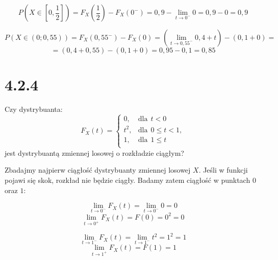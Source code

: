 \documentclass{article}
\begin{document}
\begin{equation*}
    P(X \in [0, \frac{1}{2}]) = F_{X}(\frac{1}{2}) - F_{X}(0^{-}) = 0,9 - \lim_{t \to 0^{-}} 0 = 0,9 - 0 = 0,9
\end{equation*}

\begin{equation*}
    P(X \in (0; 0,55)) = F_{X}(0,55^{-}) - F_{X}(0) = (\lim_{t \to 0,55^{-}} 0,4 + t) - (0,1 + 0) = 
\end{equation*}
\begin{equation*}
    = (0,4 + 0,55) - (0,1 + 0) = 0,95 - 0,1 = 0,85
\end{equation*}

\section*{4.2.4}

\begin{center}
    Czy dystrybuanta:
    \begin{equation*}
        F_{X}(t) = 
            \begin{cases}
                0, & \text{dla} \ \  t < 0 \\
                t^2, & \text{dla} \ \   0 \leq t < 1,\\
                1, & \text{dla} \ \  1 \leq t\\
            \end{cases}
    \end{equation*}
    jest dystrybuantą zmiennej losowej o rozkładzie ciągłym?
\end{center}

Zbadajmy najpierw ciągłość dystrybuanty zmiennej losowej \(X\). Jeśli w funkcji pojawi się skok, rozkład nie będzie
ciągły. Badamy zatem ciągłość w punktach \(0\) oraz \(1\):

\begin{equation*}
    \lim_{t \to 0^{-}} F_{X}(t) = \lim_{t \to 0^{-}} 0 = 0
\end{equation*}
\begin{equation*}
    \lim_{t \to 0^{+}} F_{X}(t) = F(0) = 0^2 = 0 
\end{equation*}

\begin{equation*}
    \lim_{t \to 1^{-}} F_{X}(t) = \lim_{t \to 1^{-}} t^2 = 1^2 = 1
\end{equation*}
\begin{equation*}
    \lim_{t \to 1^{+}} F_{X}(t) = F(1) = 1
\end{equation*}
\end{document}
